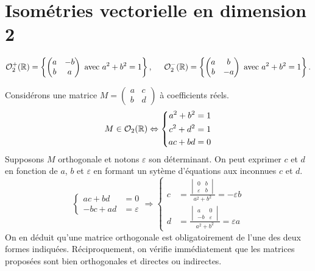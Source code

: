 \section{Isométries vectorielle en dimension 2}
\begin{prop}
\[
 \mathcal{O}_2^+(\mathbb{R}) = \left\lbrace 
 \begin{pmatrix}
  a & -b \\ b & a
 \end{pmatrix}
\text{ avec } a^2 + b^2 = 1\right\rbrace ,
\hspace{0.5cm}
\mathcal O_2^-(\mathbb{R}) =
\left\lbrace 
 \begin{pmatrix}
  a & b \\ b & -a
 \end{pmatrix}
\text{ avec } a^2 + b^2 = 1\right\rbrace .
\]
\end{prop}
\begin{demo}
 Considérons une matrice $M= \begin{pmatrix} a & c \\ b & d\end{pmatrix}$ à coefficients réels. 
 \[
  M \in \mathcal O_2(\mathbb{R}) \Leftrightarrow 
  \left\lbrace 
  \begin{aligned}
   a^2 + b^2 &= 1\\
   c^2 + d^2 &= 1\\
   ac + bd &= 0
  \end{aligned}
\right. 
 \]
Supposons $M$ orthogonale et notons $\varepsilon$ son déterminant. On peut exprimer $c$ et $d$ en fonction de $a$, $b$ et $\varepsilon$ en formant un sytème d'équations aux inconnues $c$ et $d$.
\[
 \left\lbrace 
 \begin{aligned}
  ac + bd &= 0 \\ -bc + ad &= \varepsilon 
 \end{aligned}
\right. \Rightarrow 
\left\lbrace 
\begin{aligned}
 c &= \frac{\begin{vmatrix}
             0 & b \\ \varepsilon & b 
            \end{vmatrix}
}{a^2 + b^2}
= -\varepsilon b\\
 d &= \frac{\begin{vmatrix}
             a & 0 \\ -b & \varepsilon  
            \end{vmatrix}
}{a^2 + b^2}
= \varepsilon a
\end{aligned}
\right. 
\]
On en déduit qu'une matrice orthogonale est obligatoirement de l'une des deux formes indiquées. Réciproquement, on vérifie immédiatement que les matrices proposées sont bien orthogonales et directes ou indirectes.
\end{demo}

